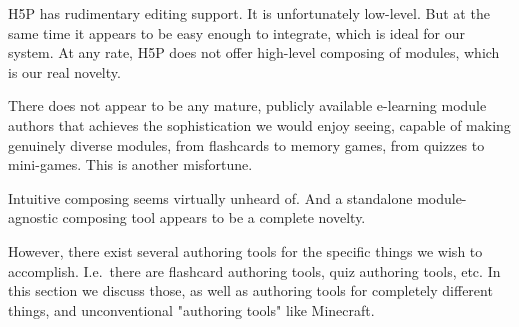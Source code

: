 H5P has rudimentary editing support. It is unfortunately low-level. But at the 
same time it appears to be easy enough to integrate, which is ideal for our 
system. At any rate, H5P does not offer high-level composing of modules, which 
is our real novelty.

There does not appear to be any mature, publicly available e-learning module 
authors that achieves the sophistication we would enjoy seeing, capable of 
making genuinely diverse modules, from flashcards to memory games, from 
quizzes to mini-games. This is another misfortune.

Intuitive composing seems virtually unheard of. And a standalone 
module-agnostic composing tool appears to be a complete novelty.

However, there exist several authoring tools for the specific things we wish 
to accomplish. I.e.\ there are flashcard authoring tools, quiz authoring 
tools, etc. In this section we discuss those, as well as authoring tools for 
completely different things, and unconventional "authoring tools" like 
Minecraft.














